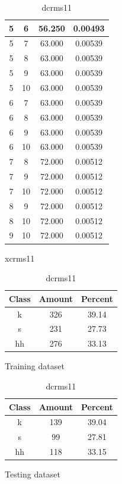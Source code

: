 \begin{table}
\begin{subtable}[h]{0.45\textwidth}
{\begin{tabular}{|c|c|c|c|}
 5 & 6 & 56.250 & 0.00493\\ \hline 
 5 & 7 & 63.000 & 0.00539\\ \hline 
 5 & 8 & 63.000 & 0.00539\\ \hline 
 5 & 9 & 63.000 & 0.00539\\ \hline 
 5 & 10 & 63.000 & 0.00539\\ \hline 
 6 & 7 & 63.000 & 0.00539\\ \hline 
 6 & 8 & 63.000 & 0.00539\\ \hline 
 6 & 9 & 63.000 & 0.00539\\ \hline 
 6 & 10 & 63.000 & 0.00539\\ \hline 
 7 & 8 & 72.000 & 0.00512\\ \hline 
 7 & 9 & 72.000 & 0.00512\\ \hline 
 7 & 10 & 72.000 & 0.00512\\ \hline 
 8 & 9 & 72.000 & 0.00512\\ \hline 
 8 & 10 & 72.000 & 0.00512\\ \hline 
 9 & 10 & 72.000 & 0.00512\\ \hline 

\end{tabular}
} \label{xlrms11}
\caption{xcrms11}
\end{subtable}

\begin{subtable}[h]{0.45\textwidth}
\centering
\begin{tabular}{|c|c|c|}
\hline
Class & Amount & Percent\\ \hline
k & 326 & 39.14\\ \hline
s & 231 & 27.73\\ \hline
hh & 276 & 33.13\\ \hline
\end{tabular}
\caption{Training dataset}
\end{subtable}
\hfill
\begin{subtable}[h]{0.45\textwidth}
\centering
\begin{tabular}{|c|c|c|}
\hline
Class & Amount & Percent\\ \hline
k & 139 & 39.04\\ \hline
s & 99 & 27.81\\ \hline
hh & 118 & 33.15\\ \hline
\end{tabular}
\caption{Testing dataset}
\end{subtable}
\hfill

\label{dlrms11}

\caption{dcrms11}

\end{table}